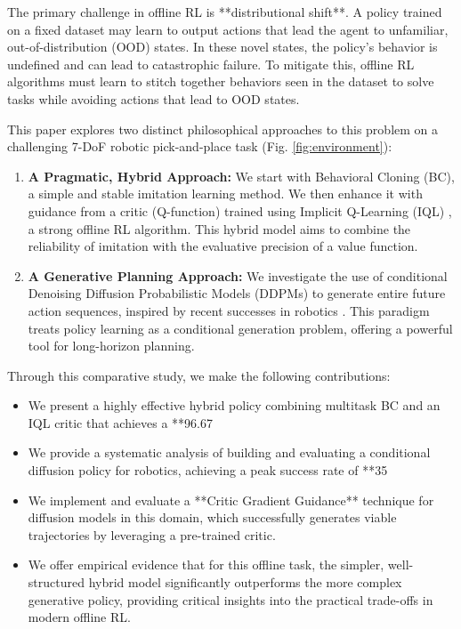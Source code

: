 \documentclass[conference]{IEEEtran}
\begin{document}
The primary challenge in offline RL is **distributional shift**. A policy trained on a fixed dataset may learn to output actions that lead the agent to unfamiliar, out-of-distribution (OOD) states. In these novel states, the policy's behavior is undefined and can lead to catastrophic failure. To mitigate this, offline RL algorithms must learn to stitch together behaviors seen in the dataset to solve tasks while avoiding actions that lead to OOD states.

This paper explores two distinct philosophical approaches to this problem on a challenging 7-DoF robotic pick-and-place task (Fig. \ref{fig:environment}):
\begin{enumerate}
    \item \textbf{A Pragmatic, Hybrid Approach:} We start with Behavioral Cloning (BC), a simple and stable imitation learning method. We then enhance it with guidance from a critic (Q-function) trained using Implicit Q-Learning (IQL) \cite{iql}, a strong offline RL algorithm. This hybrid model aims to combine the reliability of imitation with the evaluative precision of a value function.
    \item \textbf{A Generative Planning Approach:} We investigate the use of conditional Denoising Diffusion Probabilistic Models (DDPMs) \cite{ddpm} to generate entire future action sequences, inspired by recent successes in robotics \cite{diffusion_policy, bet}. This paradigm treats policy learning as a conditional generation problem, offering a powerful tool for long-horizon planning.
\end{enumerate}

Through this comparative study, we make the following contributions:
\begin{itemize}
    \item We present a highly effective hybrid policy combining multitask BC and an IQL critic that achieves a **96.67%
    \item We provide a systematic analysis of building and evaluating a conditional diffusion policy for robotics, achieving a peak success rate of **35%
    \item We implement and evaluate a **Critic Gradient Guidance** technique for diffusion models in this domain, which successfully generates viable trajectories by leveraging a pre-trained critic.
    \item We offer empirical evidence that for this offline task, the simpler, well-structured hybrid model significantly outperforms the more complex generative policy, providing critical insights into the practical trade-offs in modern offline RL.
\end{itemize}
\end{document}

